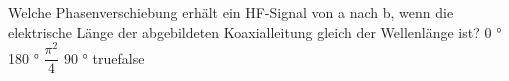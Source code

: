     {Welche Phasenverschiebung erhält ein HF-Signal von a nach b, wenn die elektrische Länge der abgebildeten Koaxialleitung gleich der Wellenlänge ist?  }
    {0 °}
    {180 °}
    {$\dfrac{\pi^2}{4}$}
    {90 °}
    {true}{false}